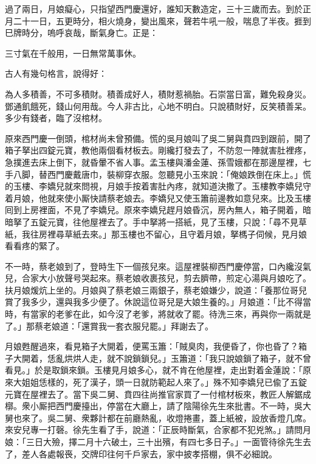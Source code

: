 過了兩日，月娘癡心，只指望西門慶還好，誰知天數造定，三十三歲而去。到於正月二十一日，五更時分，相火燒身，變出風來，聲若牛吼一般，喘息了半夜。捱到巳牌時分，嗚呼哀哉，斷氣身亡。正是：

三寸氣在千般用，一日無常萬事休。{}

古人有幾句格言，說得好：

\begin{myquote} 
為人多積善，不可多積財。積善成好人，積財惹禍胎。石崇當日富，難免殺身災。鄧通飢餓死，錢山何用哉。今人非古比，心地不明白。只說積財好，反笑積善呆。多少有錢者，臨了沒棺材。
\end{myquote} 

原來西門慶一倒頭，棺材尚未曾預備。慌的吳月娘叫了吳二舅與賁四到跟前，開了箱子拏出四錠元寶，教他兩個看材板去。剛纔打發去了，不防忽一陣就害肚裡疼，急撲進去床上倒下，就昏暈不省人事。孟玉樓與潘金蓮、孫雪娥都在那邊屋裡，七手八脚，替西門慶戴唐巾，裝柳穿衣服。忽聽見小玉來說：「俺娘跌倒在床上。」慌的玉樓、李嬌兒就來問視，月娘手按着害肚內疼，就知道決撒了。玉樓教李嬌兒守着月娘，他就來使小厮快請蔡老娘去。李嬌兒又使玉簫前邊教如意兒來。比及玉樓囘到上房裡面，不見了李嬌兒。原來李嬌兒趕月娘昏沉，房內無人，箱子開着，暗暗拏了五錠元寶，往他屋裡去了。手中拏將一搭紙，見了玉樓，只說：「尋不見草紙，我往房裡尋草紙去來。」那玉樓也不留心，且守着月娘，拏榪子伺候，見月娘看看疼的緊了。

不一時，蔡老娘到了，登時生下一個孩兒來。這屋裡裝柳西門慶停當，口內纔沒氣兒，合家大小放聲号哭起來。蔡老娘收裹孩兒，剪去臍帶，煎定心湯與月娘吃了。扶月娘煖炕上坐的。月娘與了蔡老娘三兩銀子，蔡老娘嫌少，說道：「養那位哥兒賞了我多少，還與我多少便了。休說這位哥兒是大娘生養的。」月娘道：「比不得當時，有當家的老爹在此，如今沒了老爹，將就收了罷。待洗三來，再與你一兩就是了。」那蔡老娘道：「還賞我一套衣服兒罷。」拜謝去了。

月娘甦醒過來，看見箱子大開着，便罵玉簫：「賊臭肉，我便昏了，你也昏了？箱子大開着，恁亂烘烘人走，就不說鎖鎖兒。」玉簫道：「我只說娘鎖了箱子，就不曾看見。」於是取鎖來鎖。玉樓見月娘多心，就不肯在他屋裡，走出對着金蓮說：「原來大姐姐恁樣的，死了漢子，頭一日就防範起人來了。」殊不知李嬌兒已偸了五錠元寶在屋裡去了。當下吳二舅、賁四往尚推官家買了一付棺材板來，教匠人解鋸成槨。衆小厮把西門慶擡出，停當在大廳上，請了陰陽徐先生來批書。不一時，吳大舅也來了。吳二舅、衆夥計都在前廳熱亂，收燈捲畫，蓋上紙被，設放香燈几席。來安兒專一打磬。徐先生看了手，說道：「正辰時斷氣，合家都不犯兇煞。」請問月娘：「三日大殮，擇二月十六破土，三十出殯，有四七多日子。」一面管待徐先生去了，差人各處報䘮，交牌印往何千戶家去，家中披孝搭棚，俱不必細說。

